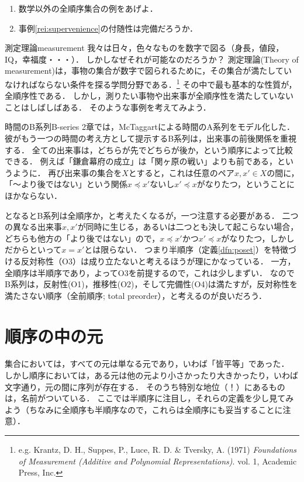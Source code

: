 \documentclass[dvipdfmx,11pt,a4paper]{jsarticle}
\begin{document}
\begin{renshu}{}{}
\begin{enumerate}
 \item 数学以外の全順序集合の例をあげよ．
 \item 事例\ref{rei:supervenience}の付随性は完備だろうか．
\end{enumerate}
\end{renshu}


\begin{rei}{測定理論}{measurement}
我々は日々，色々なものを数字で図る（身長，値段，IQ，幸福度・・・）．
しかしなぜそれが可能なのだろうか？
測定理論(Theory of measurement)は，事物の集合が数字で図られるために，その集合が満たしていなければならない条件を探る学問分野である．\footnote{e.g. Krantz, D. H., Suppes, P., Luce, R. D. \& Tversky, A. (1971) \textit{Foundations of Measurement (Additive and Polynomial Representations)}. vol. 1, Academic Press, Inc.}
その中で最も基本的な性質が，全順序性である．
しかし，測りたい事物や出来事が全順序性を満たしていないことはしばしばある．
そのような事例を考えてみよう．
\end{rei}


\begin{rei}{時間のB系列}{B-series}
2章では，McTaggartによる時間のA系列をモデル化した．
彼がもう一つの時間の考え方として提示するB系列は，出来事の前後関係を重視する．
全ての出来事は，どちらが先でどちらが後か，という順序によって比較できる．
例えば「鎌倉幕府の成立」は「関ヶ原の戦い」よりも前である，というように．
再び出来事の集合を$X$とすると，これは任意のペア$x, x' \in X$の間に，「〜より後ではない」という関係$x \preceq x'$ないし$x' \preceq x$がなりたつ，ということにほかならない．

となるとB系列は全順序か，と考えたくなるが，一つ注意する必要がある．
二つの異なる出来事$x, x'$が同時に生じる，あるいは二つとも決して起こらない場合，どちらも他方の「より後ではない」ので，$x \preceq x'$かつ$x' \preceq x$がなりたつ，しかしだからといって$x = x'$とは限らない．
つまり半順序（定義\ref{dfn:poset}）を特徴づける反対称性（O3）は成り立たないと考えるほうが理にかなっている．
一方，全順序は半順序であり，よってO3を前提するので，これは少しまずい．
なのでB系列は，反射性(O1)，推移性(O2)，そして完備性(O4)は満たすが，反対称性を満たさない順序（全前順序; total preorder），と考えるのが良いだろう．
\end{rei}



\section{順序の中の元}
集合においては，すべての元は単なる元であり，いわば「皆平等」であった．
しかし順序においては，ある元は他の元より小さかったり大きかったり，いわば文字通り，元の間に序列が存在する．
そのうち特別な地位（！）にあるものは，名前がついている．
ここでは半順序に注目し，それらの定義を少し見てみよう（ちなみに全順序も半順序なので，これらは全順序にも妥当することに注意）．
\end{document}
